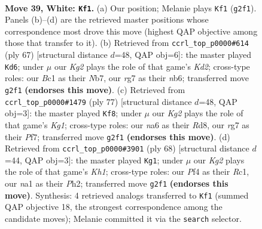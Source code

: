 \documentclass[11pt]{article}
\begin{document}
\clearpage

\begin{figure}[p]\centering
\begin{subfigure}{0.46\textwidth}\centering
\resizebox{\linewidth}{!}{%
\newchessgame
\chessboard[
  setfen={4k3/1p2p1rp/n5p1/pNp5/5P1P/2P2P2/P5K1/n1BR4 w - - 3 39},
  showmover=false,
  pgfstyle=straightmove, color=movearrow, markmove={g2-f1}
]}
\caption{}
\end{subfigure}\hfill
\begin{subfigure}{0.46\textwidth}\centering
\resizebox{\linewidth}{!}{%
\newchessgame
\chessboard[
  setfen={1r6/1n1k2p1/1N2pp2/p6p/7P/P7/1PR2PP1/5K2 b - - 7 34},
  showmover=false,
  pgfstyle=straightmove, color=movearrow, markmove={d7-d6}
]}
\caption{}
\end{subfigure}
\\[4pt]
\begin{subfigure}{0.46\textwidth}\centering
\resizebox{\linewidth}{!}{%
\newchessgame
\chessboard[
  setfen={3r2k1/1p3pp1/1pp3n1/8/P7/1P2R1PP/4NP2/6K1 b - - 4 39},
  showmover=false,
  pgfstyle=straightmove, color=movearrow, markmove={g8-f8}
]}
\caption{}
\end{subfigure}\hfill
\begin{subfigure}{0.46\textwidth}\centering
\resizebox{\linewidth}{!}{%
\newchessgame
\chessboard[
  setfen={4n1k1/r6p/pp4p1/3P4/PP6/3p1B2/6PP/2R4K w - - 0 35},
  showmover=false,
  pgfstyle=straightmove, color=movearrow, markmove={h1-g1}
]}
\caption{}
\end{subfigure}
\caption{\textbf{Move 39, White: \texttt{Kf1}.} (a) Our position; Melanie plays \texttt{Kf1} (\texttt{g2f1}). Panels (b)--(d) are the retrieved master positions whose correspondence most drove this move (highest QAP objective among those that transfer to it). (b) Retrieved from \texttt{ccrl\_top\_p0000\#614} (ply 67) [structural distance $d$=48, QAP obj=6]: the master played \texttt{Kd6}; under $\mu$ our \emph{Kg2} plays the role of that game's \emph{Kd2}; cross-type roles: our \emph{B}c1 as their \emph{N}b7, our \emph{r}g7 as their \emph{n}b6; transferred move \texttt{g2f1} \textbf{(endorses this move)}. (c) Retrieved from \texttt{ccrl\_top\_p0000\#1479} (ply 77) [structural distance $d$=48, QAP obj=3]: the master played \texttt{Kf8}; under $\mu$ our \emph{Kg2} plays the role of that game's \emph{Kg1}; cross-type roles: our \emph{n}a6 as their \emph{R}d8, our \emph{r}g7 as their \emph{P}f7; transferred move \texttt{g2f1} \textbf{(endorses this move)}. (d) Retrieved from \texttt{ccrl\_top\_p0000\#3901} (ply 68) [structural distance $d$=44, QAP obj=3]: the master played \texttt{Kg1}; under $\mu$ our \emph{Kg2} plays the role of that game's \emph{Kh1}; cross-type roles: our \emph{P}f4 as their \emph{R}c1, our \emph{n}a1 as their \emph{P}h2; transferred move \texttt{g2f1} \textbf{(endorses this move)}. Synthesis: 4 retrieved analogs transferred to \texttt{Kf1} (summed QAP objective 18, the strongest correspondence among the candidate moves); Melanie committed it via the \texttt{search} selector.}
\label{fig:thought-m76}
\end{figure}
\end{document}
